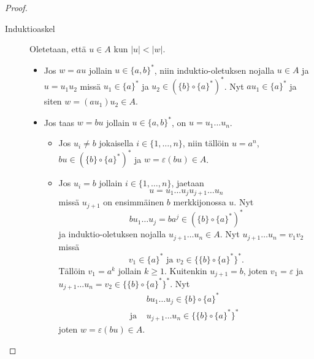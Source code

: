 \documentclass[a4paper,11pt,draft]{article}
\begin{document}
\begin{enumerate}
\begin{enumerate}
\begin{proof}
\begin{description}
      \item[Induktioaskel]
        Oletetaan, että $u \in A$ kun $|u| < |w|$.

        \begin{itemize}
        \item
          Jos $w = au$ jollain $u \in \{a,b\}^*$, niin
          induktio-oletuksen nojalla $u \in A$ ja $u = u_1u_2$ missä
          $u_1 \in \{a\}^*$ ja $u_2 \in (\{b\} \circ \{a\}^*)^*$.
          Nyt $au_1 \in \{a\}^*$ ja siten $w = (au_1)u_2 \in A$.

        \item
          Jos taas $w = bu$ jollain $u \in \{a,b\}^*$, on $u = u_1
          \ldots u_n$.

          \begin{itemize}
          \item
            Jos $u_i \neq b$ jokaisella $i \in \{1, \ldots, n\}$,
            niin tällöin $u = a^n$, $bu \in (\{b\} \circ
            \{a\}^*)^*$ ja $w = \varepsilon (bu) \in A$.

          \item
            Jos $u_i = b$ jollain $i \in \{1, \ldots, n\}$, jaetaan
%
            \begin{equation*}
              u = u_1 \ldots u_ju_{j+1} \ldots u_n
            \end{equation*}
%
            missä $u_{j+1}$ on ensimmäinen $b$ merkkijonossa $u$. Nyt
%
            \begin{equation*}
              bu_1 \ldots u_j = ba^j \in (\{b\} \circ \{a\}^*)^*
            \end{equation*}
%
            ja induktio-oletuksen nojalla $u_{j+1} \ldots u_n \in A$. Nyt
            $u_{j+1} \ldots u_n = v_1v_2$ missä
%
            \begin{equation*}
              v_1 \in \{a\}^* \text{ ja }
              v_2 \in \{ \{b\} \circ \{a\}^* \}^* \text{.}
            \end{equation*}
%
            Tällöin $v_1 = a^k$ jollain $k \ge 1$. Kuitenkin $u_{j+1} =
            b$, joten $v_1 = \varepsilon$ ja $u_{j+1} \ldots u_n = v_2 \in
            \{\{b\} \circ \{a\}^*\}^*$. Nyt
%
            \begin{align*}
                          & bu_1 \ldots u_j \in \{b\} \circ \{a\}^* &  \\
              \text{ ja } & u_{j+1} \ldots u_n \in \{\{b\} \circ \{a\}^*\}^*
            \end{align*}
%
            joten $w = \varepsilon (bu) \in A$.


\end{itemize}
\end{itemize}
\end{description}
\end{proof}
\end{enumerate}
\end{enumerate}
\end{document}
